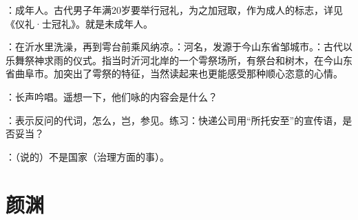 {\item {}：成年人。古代男子年满20岁要举行冠礼，为之加冠取，作为成人的标志，详见《仪礼·士冠礼》。就是未成年人。
\item {}：在沂水里洗澡，再到雩台前乘风纳凉。：河名，发源于今山东省邹城市。：古代以乐舞祭神求雨的仪式。指当时沂河北岸的一个雩祭场所，有祭台和树木，在今山东省曲阜市。加突出了雩祭的特征，当然读起来也更能感受那种顺心恣意的心情。%
\item {}：长声吟唱。遥想一下，他们咏的内容会是什么？
\item {}：表示反问的代词，怎么，岂，参见。练习：快递公司用“所托安至”的宣传语，是否妥当？
\item {}：（说的）不是国家（治理方面的事）。
}
{}



\chapter{颜渊}


